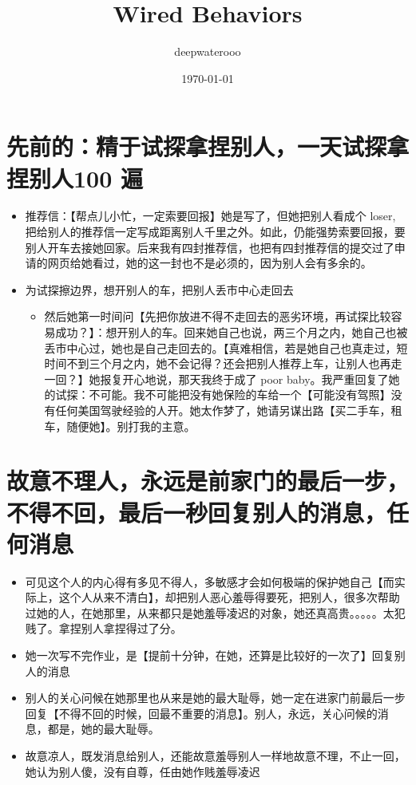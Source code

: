 \documentclass[9pt, b5paper]{article}
\author{deepwaterooo}
\date{\today}
\title{Wired Behaviors}
\begin{document}
\maketitle
\tableofcontents


\section{先前的：精于试探拿捏别人，一天试探拿捏别人100 遍}
\label{sec-1}
\begin{itemize}
\item 推荐信：【帮点儿小忙，一定索要回报】她是写了，但她把别人看成个 loser, 把给别人的推荐信一定写成距离别人千里之外。如此，仍能强势索要回报，要别人开车去接她回家。后来我有四封推荐信，也把有四封推荐信的提交过了申请的网页给她看过，她的这一封也不是必须的，因为别人会有多余的。
\item 为试探擦边界，想开别人的车，把别人丢市中心走回去
\begin{itemize}
\item 然后她第一时间问【先把你放进不得不走回去的恶劣环境，再试探比较容易成功？】：想开别人的车。回来她自己也说，两三个月之内，她自己也被丢市中心过，她也是自己走回去的。【真难相信，若是她自己也真走过，短时间不到三个月之内，她不会记得？还会把别人推荐上车，让别人也再走一回？】她报复开心地说，那天我终于成了 poor baby。我严重回复了她的试探：不可能。我不可能把没有她保险的车给一个【可能没有驾照】没有任何美国驾驶经验的人开。她太作梦了，她请另谋出路【买二手车，租车，随便她】。别打我的主意。
\end{itemize}
\end{itemize}
\section{故意不理人，永远是前家门的最后一步，不得不回，最后一秒回复别人的消息，任何消息}
\label{sec-2}
\begin{itemize}
\item 可见这个人的内心得有多见不得人，多敏感才会如何极端的保护她自己【而实际上，这个人从来不清白】，却把别人恶心羞辱得要死，把别人，很多次帮助过她的人，在她那里，从来都只是她羞辱凌迟的对象，她还真高贵。。。。。太犯贱了。拿捏别人拿捏得过了分。
\item 她一次写不完作业，是【提前十分钟，在她，还算是比较好的一次了】回复别人的消息
\item 别人的关心问候在她那里也从来是她的最大耻辱，她一定在进家门前最后一步回复【不得不回的时候，回最不重要的消息】。别人，永远，关心问候的消息，都是，她的最大耻辱。
\item 故意凉人，既发消息给别人，还能故意羞辱别人一样地故意不理，不止一回，她认为别人傻，没有自尊，任由她作贱羞辱凌迟
\end{itemize}
\end{document}
